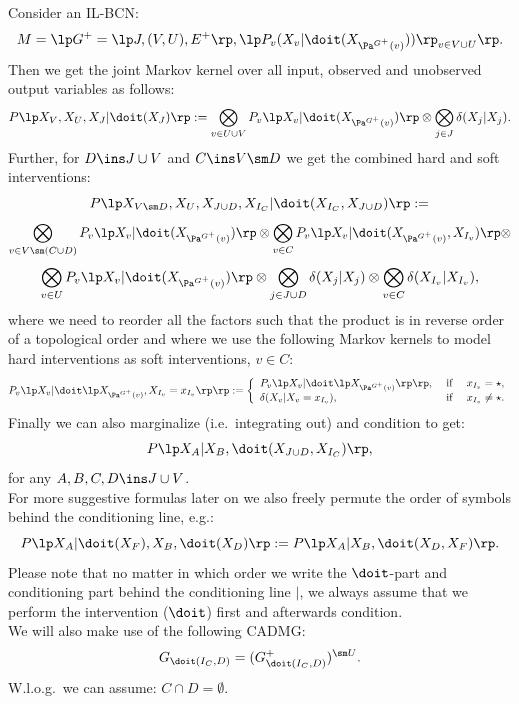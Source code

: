 \begin{Rem}[Recap]
    \label{rem-bcn-notation}
    Consider an IL-BCN:
    \[M= \lp G^+=\lp J,(V,U),E^+ \rp, \lp P_v ( X_v|\doit( X_{\Pa^{G^+}(v)})) \rp_{v \in V \cup U} \rp.  \]
        Then we get the joint  Markov kernel over all input, observed and unobserved output variables as follows:
        \[ P\lp X_V,X_U,X_J|\doit(X_J) \rp := \bigotimes_{v \in U \cup V} P_v\lp X_v|\doit(X_{\Pa^{G^+}(v)})\rp \otimes 
        \bigotimes_{j \in J} \delta(X_j|X_j).\]
    Further, for $D \ins J \cup V$ and $C \ins V \sm D$ we get the combined hard and soft interventions:
    \[ P\lp X_{V \sm D},X_U,X_{J \cup D},X_{I_C}| \doit(X_{I_C},X_{J \cup D}) \rp :=\] 
    \[    \bigotimes_{v \in V \sm (C \cup D)} P_v\lp X_v|\doit(X_{\Pa^{G^+}(v)})\rp \otimes 
    \bigotimes_{v \in C} P_v\lp X_v|\doit(X_{\Pa^{G^+}(v)},X_{I_v})\rp \otimes \]
     \[   \bigotimes_{v \in U} P_v\lp X_v|\doit(X_{\Pa^{G^+}(v)})\rp \otimes 
     \bigotimes_{j \in J \cup D} \delta(X_j|X_j) \otimes\bigotimes_{v \in C} \delta(X_{I_v}|X_{I_v})  ,\]
       where we need to reorder all the factors such that the product is in reverse order of a topological order and 
       where we use the following Markov kernels to model hard interventions as  soft interventions, $v\in C$: 
       \[ P_v\lp X_v|\doit\lp X_{\Pa^{G^+}(v)},X_{I_v}=x_{I_v}\rp\rp := 
         \left\{ \begin{array}{lll}
                 P_v\lp X_v|\doit\lp X_{\Pa^{G^+}(v)}\rp\rp, & \text{ if } & x_{I_v} = \star, \\
    \delta(X_v|X_v =x_{I_v}),  & \text{ if } & x_{I_v} \neq \star. 
                \end{array}\right.\]
  Finally we can also marginalize (i.e.\ integrating out) and condition to get: 
  \[ P\lp X_A|X_B, \doit(X_{J \cup D},X_{I_C}) \rp ,\]
for any $A,B,C,D \ins J \cup V$.\\
For more suggestive formulas later on we also freely permute the order of symbols behind the conditioning line, e.g.:
\[ P\lp X_A|\doit(X_F),X_B, \doit(X_D) \rp := P\lp X_A|X_B, \doit(X_D,X_F) \rp.\]
Please note that no matter in which order we write the $\doit$-part and conditioning part behind the conditioning line $|$, we always assume that we perform the intervention ($\doit$) first and afterwards condition.\\
We will also make use of the following CADMG:
\[ G_{\doit(I_C,D)} = (G^+_{\doit(I_C,D)})^{\sm U}.  \]
W.l.o.g.\ we can assume: $C \cap D = \emptyset$.
\end{Rem}

